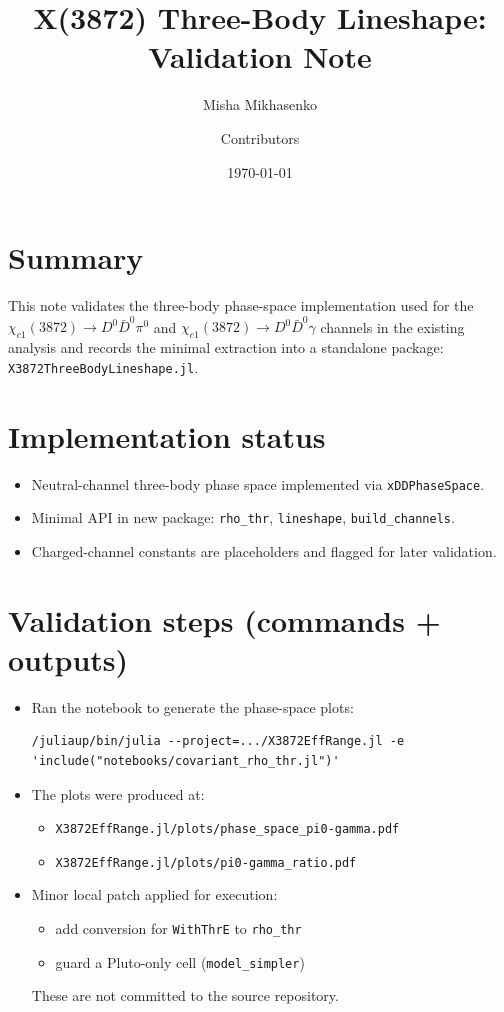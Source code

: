 \documentclass[11pt]{article}
\title{X(3872) Three-Body Lineshape: Validation Note}
\author{Misha Mikhasenko \and Contributors}
\date{\today}
\begin{document}
\maketitle

\section*{Summary}
This note validates the three-body phase-space implementation used for the
$\chi_{c1}(3872) \to D^0\bar D^0\pi^0$ and $\chi_{c1}(3872) \to D^0\bar D^0\gamma$
channels in the existing analysis and records the minimal extraction into a
standalone package: \texttt{X3872ThreeBodyLineshape.jl}.

\section*{Implementation status}
\begin{itemize}[leftmargin=1.5em]
    \item Neutral-channel three-body phase space implemented via \texttt{xDDPhaseSpace}.
    \item Minimal API in new package: \texttt{rho\_thr}, \texttt{lineshape}, \texttt{build\_channels}.
    \item Charged-channel constants are placeholders and flagged for later validation.
\end{itemize}

\section*{Validation steps (commands + outputs)}
\begin{itemize}[leftmargin=1.5em]
    \item Ran the notebook to generate the phase-space plots:
\begin{verbatim}
/juliaup/bin/julia --project=.../X3872EffRange.jl -e 'include("notebooks/covariant_rho_thr.jl")'
\end{verbatim}
    \item The plots were produced at:
    \begin{itemize}
        \item \texttt{X3872EffRange.jl/plots/phase\_space\_pi0-gamma.pdf}
        \item \texttt{X3872EffRange.jl/plots/pi0-gamma\_ratio.pdf}
    \end{itemize}
    \item Minor local patch applied for execution:
    \begin{itemize}
        \item add conversion for \texttt{WithThrE} to \texttt{rho\_thr}
        \item guard a Pluto-only cell (\texttt{model\_simpler})
    \end{itemize}
    These are not committed to the source repository.
\end{itemize}
\end{document}
